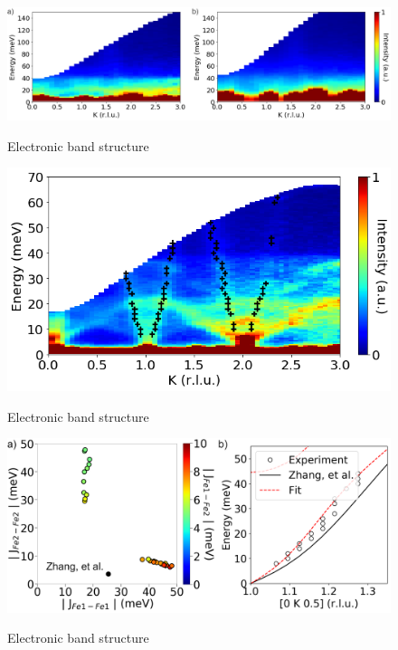 \documentclass[11pt,edeposit,draftthesis]{uiucthesis2020}
\begin{document}
\begin{mainmatter}
\begin{figure}
\centering\includegraphics[width=\columnwidth]{figures/ch8/suppl_high_energy_data.png} \\
\caption{\label{fig:high_energy_data}
Electronic band structure
}
\end{figure}

\begin{figure}
\centering\includegraphics[width=\columnwidth]{figures/ch8/exp_data_points_0K0dot5.png} \\
\caption{\label{fig:exp_points}
Electronic band structure
}
\end{figure}

\begin{figure}
\centering\includegraphics[width=\columnwidth]{figures/ch8/magnon_spectra_refinement.png} \\
\caption{\label{fig:refinement}
Electronic band structure
}
\end{figure}


\end{mainmatter}
\end{document}
